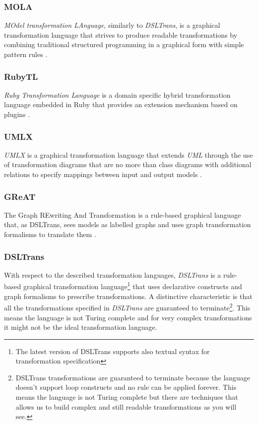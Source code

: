 \subsubsection{MOLA}

\emph{MOdel transformation LAnguage}, similarly to \emph{DSLTrans}, is a graphical
transformation language that strives to produce readable transformations by
combining traditional structured programming in a graphical form with simple
pattern rules \cite{mola_trans_language}.


\subsubsection{RubyTL}

\emph{Ruby Transformation Language} is a domain specific hybrid
transformation language embedded in Ruby that provides an extension
mechanism based on plugins \cite{rubytl}.

\subsubsection{UMLX}

\emph{UMLX} is a graphical transformation language that extends \emph{UML}
through the use of transformation diagrams that are no more than class diagrams
with additional relations to specify mappings between input and
output models \cite{umlx}.

\subsubsection{GReAT}

The Graph REwriting And Transformation is a rule-based graphical language that,
as DSLTrans, sees models as labelled graphs and uses graph
transformation formalisms to translate them \cite{great}.

\subsubsection{\textbf{DSLTrans}}

With respect to the described transformation languages, \emph{DSLTrans} is a
rule-based graphical transformation language\footnote{The latest version of DSLTrans supports also textual syntax for transformation specification} that uses declarative constructs and graph formalisms to prescribe transformations. A distinctive characteristic is that all the
transformations specified in \emph{DSLTrans} are guaranteed to terminate\footnote{DSLTrans
transformations are guaranteed to terminate because the language doesn't
support loop constructs and no rule can be applied forever. This means the
language is not Turing complete but there are techniques that allows us to
build complex and still readable transformations as you will see.}.
This means the language is not Turing complete and for very complex transformations it might not be the ideal transformation language.



